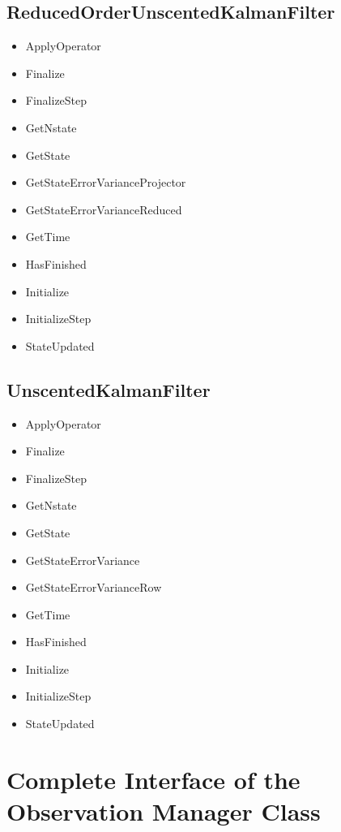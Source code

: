 \documentclass{tufte-book}
\begin{document}
\subsection{ReducedOrderUnscentedKalmanFilter}

\begin{itemize}
\item ApplyOperator
\item Finalize
\item FinalizeStep
\item GetNstate
\item GetState
\item GetStateErrorVarianceProjector
\item GetStateErrorVarianceReduced
\item GetTime
\item HasFinished
\item Initialize
\item InitializeStep
\item StateUpdated
\end{itemize}

\subsection{UnscentedKalmanFilter}

\begin{itemize}
\item ApplyOperator
\item Finalize
\item FinalizeStep
\item GetNstate
\item GetState
\item GetStateErrorVariance
\item GetStateErrorVarianceRow
\item GetTime
\item HasFinished
\item Initialize
\item InitializeStep
\item StateUpdated
\end{itemize}



\hypertarget{observation_manager_template}{
\section{Complete Interface of the Observation Manager Class}
\label{observation_manager_template}
}
\end{document}
